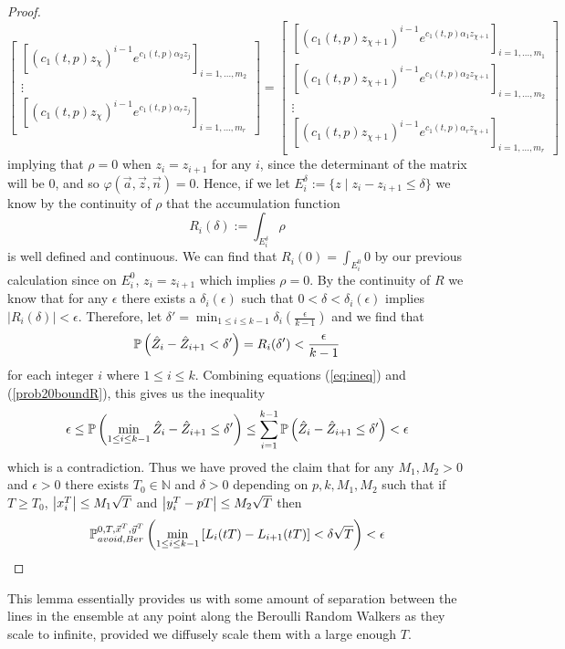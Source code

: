 \begin{proof}
\[\begin{bmatrix}
	\left[(c_1(t,p)z_\chi)^{i-1}e^{c_1(t,p)\alpha_2 z_j}\right]_{i=1,...,m_2}\\
	\vdots \\
	\left[(c_1(t,p)z_\chi)^{i-1}e^{c_1(t,p)\alpha_r z_j}\right]_{i=1,...,m_r}
	\end{bmatrix}=\begin{bmatrix}
	\left[(c_1(t,p)z_{\chi+1})^{i-1}e^{c_1(t,p)\alpha_1 z_{\chi+1}}\right]_{i=1,...,m_1}\\
	\left[(c_1(t,p)z_{\chi+1})^{i-1}e^{c_1(t,p)\alpha_2 z_{\chi+1}}\right]_{i=1,...,m_2}\\
	\vdots \\
	\left[(c_1(t,p)z_{\chi+1})^{i-1}e^{c_1(t,p)\alpha_r z_{\chi+1}}\right]_{i=1,...,m_r}
	\end{bmatrix}\]
	implying that $\rho=0$ when $z_i=z_{i+1}$ for any $i$, since the determinant of the matrix will be $0$, and so $\varphi(\vec a, \vec z, \vec n)=0$. Hence, if we let $E_i^\delta:=\{z\mid z_i-z_{i+1}\leq\delta\}$ we know by the continuity of $\rho$ that the accumulation function \[R_i(\delta):=\int_{E_i^\delta}\rho\] is well defined and continuous. We can find that $R_i(0)=\int_{E_i^0} 0$ by our previous calculation since on $E_i^0$, $z_i=z_{i+1}$ which implies $\rho=0$. By the continuity of $R$ we know that for any $\epsilon$ there exists a $\delta_i(\epsilon)$ such that $0<\delta<\delta_i(\epsilon)$ implies $|R_i(\delta)|<\epsilon$. Therefore, let $\delta'=\min_{1\leq i\leq k-1}\delta_i\left(\frac\epsilon{k-1}\right)$ and we find that 
	\begin{equation}\label{prob20boundR}\pr\left( \hat Z_i-\hat Z_{i+1}<\delta' \right)=R_i(\delta')<\frac{\epsilon}{k-1}
	\end{equation}
	for each integer $i$ where $1\leq i\leq k$. Combining equations (\ref{eq:ineq}) and (\ref{prob20boundR}), this gives us the inequality 
	\[\epsilon\leq \pr\left(\min_{1\leq i\leq k-1} \hat Z_i-\hat Z_{i+1}\leq\delta'\right)\leq \sum_{i=1}^{k-1}\pr\left(\hat Z_i-\hat Z_{i+1}\leq \delta'\right)< \epsilon
	\]
	which is a contradiction. Thus we have proved the claim that for any $M_1,M_2>0$ and $\epsilon>0$ there exists $T_0\in\mathbb{N}$ and $\delta>0$ depending on $p,k,M_1,M_2$ such that if $T\geq T_0$, $\abs*{x_i^T}\leq M_1\sqrt{T}$ and $\abs*{y_i^T-pT}\leq M_2\sqrt{T}$ then 
	\[
	\pr^{0,T,\vec x^T, \vec y^T}_{avoid,Ber}\left(\min_{1\leq i\leq k-1} \left[L_i(tT)-L_{i+1}(tT)\right]<\delta\sqrt{T}\right)<\epsilon
	\]
\end{proof}
\begin{remark}
	This lemma essentially provides us with some amount of separation between the lines in the ensemble at any point along the Beroulli Random Walkers as they scale to infinite, provided we diffusely scale them with a large enough $T$.
\end{remark}
